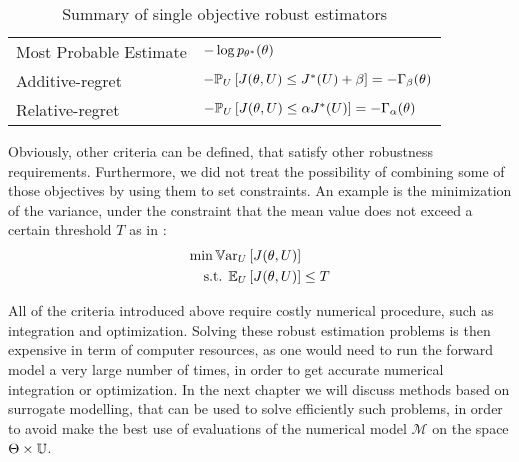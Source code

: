 \documentclass[../../Main_ManuscritThese.tex]{subfiles}
\begin{document}
\begin{table}[ht]
\begin{tabular}{ll}
    Most Probable Estimate        & $-\log p_{\theta^*}(\theta)$                                                                                                 \\
    Additive-regret               & $-\mathbb{P}_{U}\left[J(\theta, U) \leq J^*(U) + \beta \right]=-\Gamma_{\beta}(\theta)$                                     \\
    Relative-regret               & $-\mathbb{P}_{U}\left[J(\theta, U) \leq \alpha J^*(U) \right]=-\Gamma_{\alpha}(\theta) $                                    \\ \bottomrule
  \end{tabular}
  \caption{\label{tab:summary_robust} Summary of single objective robust estimators}
\end{table}
 
Obviously, other criteria can be defined, that satisfy other robustness requirements.
Furthermore, we did not treat the possibility of combining some of those objectives by using them to set constraints. An example is the minimization of  the variance, under the constraint that the mean value does not exceed a certain threshold $T$ as in \cite{lehman_designing_2004}:
\begin{align*}
  \min \mathbb{V}\mathrm{ar}_{U}&\left[J(\theta, U)\right]  \\
  \text{s.t. } \mathbb{E}_{U}&\left[J(\theta, U)\right]   \leq T
\end{align*}

All of the criteria introduced above require costly numerical procedure, such as integration and optimization. Solving these robust estimation problems is then expensive in term of computer resources, as one would need to run the forward model a very large number of times, in order to get accurate numerical integration or optimization. In the next chapter we will discuss methods based on surrogate modelling, that can be used to solve efficiently such problems, in order to avoid make the best use of evaluations of the numerical model $\mathcal{M}$ on the space $\Theta \times\mathbb{U}$. 

\etoile
\vfill

\subfileLocal{
	\pagestyle{empty}
	
	
      }
\end{document}
